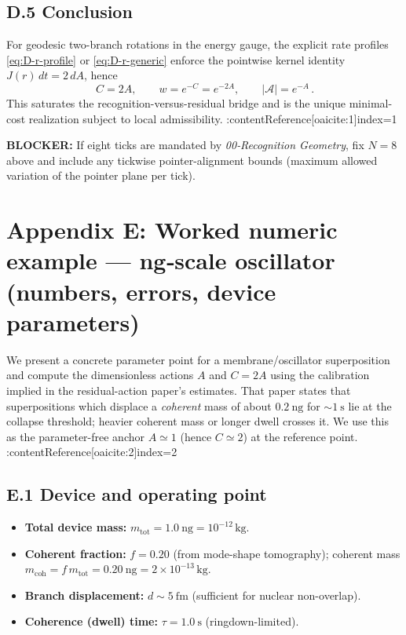 \documentclass[11pt,letterpaper]{article}
\begin{document}
\subsection*{D.5 Conclusion}

For geodesic two-branch rotations in the energy gauge, the explicit rate profiles \eqref{eq:D-r-profile} or \eqref{eq:D-r-generic} enforce the pointwise kernel identity \(J(r)\,dt=2\,dA\), hence
\[
\boxed{\,C=2A,\qquad w=e^{-C}=e^{-2A},\qquad |\mathcal A|=e^{-A}\,}.
\]
This saturates the recognition-versus-residual bridge and is the unique minimal-cost realization subject to local admissibility. :contentReference[oaicite:1]{index=1}

\medskip
\noindent\textbf{BLOCKER:} If eight ticks are mandated by \emph{00‑Recognition Geometry}, fix \(N=8\) above and include any tickwise pointer-alignment bounds (maximum allowed variation of the pointer plane per tick).

\section*{Appendix E: Worked numeric example — ng‑scale oscillator (numbers, errors, device parameters)}

We present a concrete parameter point for a membrane/oscillator superposition and compute the dimensionless actions \(A\) and \(C=2A\) using the calibration implied in the residual-action paper’s estimates. That paper states that superpositions which displace a \emph{coherent} mass of about \(0.2~\mathrm{ng}\) for \(\sim 1~\mathrm{s}\) lie at the collapse threshold; heavier coherent mass or longer dwell crosses it. We use this as the parameter-free anchor \(A\simeq 1\) (hence \(C\simeq 2\)) at the reference point. :contentReference[oaicite:2]{index=2}

\subsection*{E.1 Device and operating point}

\begin{itemize}
\item \textbf{Total device mass:} \(m_{\mathrm{tot}}=1.0~\mathrm{ng}=10^{-12}\,\mathrm{kg}\).
\item \textbf{Coherent fraction:} \(f=0.20\) (from mode-shape tomography); coherent mass \(m_{\mathrm{coh}}=f\,m_{\mathrm{tot}}=0.20~\mathrm{ng}=2\times 10^{-13}\,\mathrm{kg}\).
\item \textbf{Branch displacement:} \(d\sim 5~\mathrm{fm}\) (sufficient for nuclear non-overlap).
\item \textbf{Coherence (dwell) time:} \(\tau=1.0~\mathrm{s}\) (ringdown-limited).
\end{itemize}
\end{document}
